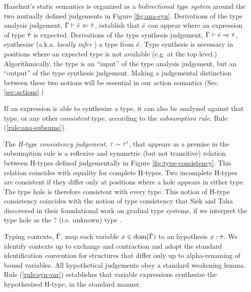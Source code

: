 Hazelnut's static semantics is organized as a \emph{bidirectional type
  system}
\cite{Pierce:2000:LTI:345099.345100,DBLP:conf/icfp/DaviesP00,DBLP:conf/tldi/ChlipalaPH05,bidi-tutorial}
around the two mutually defined judgements in Figure
\ref{fig:ana-syn}. Derivations of the type analysis judgement, $\dot{\Gamma} \vdash \dot{e} \Leftarrow \dot{\tau}$,
establish that $\dot{e}$ can appear where an expression of type $\dot{\tau}$ is
expected. Derivations of the type synthesis judgement,
$\dot{\Gamma} \vdash \dot{e} \Rightarrow \dot{\tau}$, synthesize (a.k.a. \emph{locally infer} \cite{Pierce:2000:LTI:345099.345100}) a type from $\dot{e}$. Type synthesis is
necessary in positions where an expected type is not available (e.g. at the
top level.) Algorithmically, the type is an ``input'' of the type analysis
judgement, but an ``output'' of the type synthesis judgement.  Making a
judgemental distinction between these two notions will be essential in our
action semantics (Sec. \ref{sec:actions}.) 

If an expression is 
able to synthesize a type, it can also be analyzed against that type, or
any other \emph{consistent} type, according to the \emph{subsumption rule},
Rule (\ref{rule:ana-subsume}).%

The \emph{H-type consistency judgement}, $\dot{\tau} \sim \dot{\tau}'$, that
appears as a premise in the subsumption rule is a reflexive and symmetric
(but not transitive) relation between H-types defined judgementally in
Figure \ref{fig:type-consistency}. This relation coincides with equality
for complete H-types. Two incomplete H-types are consistent if they differ
only at positions where a hole appears in either type. The type hole is
therefore consistent with every type. This notion of H-type consistency
coincides with the notion of type consistency that Siek and Taha discovered
in their foundational work on gradual type systems, if we interpret the
type hole as the $?$ (i.e. unknown) type \cite{Siek06a}.

Typing contexts, $\dot{\Gamma}$, map each variable $x \in
\text{dom}(\dot{\Gamma})$ to an hypothesis $x : \dot{\tau}$. We
identify contexts up to exchange and contraction and adopt the standard identification
convention for structures that differ only up to alpha-renaming of bound variables. All hypothetical judgements obey a standard weakening lemma. Rule (\ref{rule:syn-var}) establishes that variable expressions synthesize the hypothesized H-type, in the standard manner.

